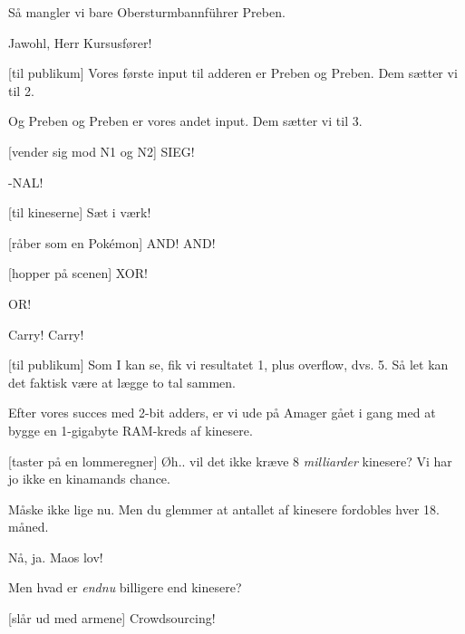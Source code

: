 \documentclass[a4paper,11pt]{article}
\begin{document}
\begin{sketch}
 Så mangler vi bare Obersturmbannführer Preben.


 Jawohl, Herr Kursusfører!


[til publikum] Vores første input til adderen er Preben og
Preben. Dem sætter vi til 2.


 Og Preben og Preben er vores andet input. Dem sætter vi til 3.

[vender sig mod N1 og N2] SIEG!

 -NAL!


[til kineserne] Sæt i værk!

[råber som en Pokémon] AND! AND!


[hopper på scenen] XOR!


 OR!


 Carry! Carry!

[til publikum] Som I kan se, fik vi resultatet 1, plus overflow, dvs.
5. Så let kan det faktisk være at lægge to tal sammen.


 Efter vores succes med 2-bit adders, er vi ude på Amager gået i gang
med at bygge en 1-gigabyte RAM-kreds af kinesere.

[taster på en lommeregner] Øh.. vil det ikke kræve 8 \textit{milliarder}
kinesere? Vi har jo ikke en kinamands chance.

 Måske ikke lige nu. Men du glemmer at antallet af kinesere fordobles
hver 18. måned.

 Nå, ja. Maos lov!

 Men hvad er \textit{endnu} billigere end kinesere?

[slår ud med armene] Crowdsourcing!


\end{sketch}
\end{document}
